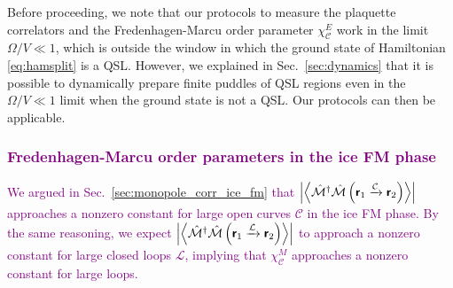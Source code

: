 \documentclass[twocolumn,superscriptaddress,amsmath,amssymb,aps,prx,nofootinbib]{revtex4-2}
\newcommand{\dual}[1]{\boldsymbol{\mathsf{#1}}}
\newcommand{\newtext}[1]{\textcolor{purple}{#1}}
\begin{document}
Before proceeding, we note that our protocols to measure the plaquette correlators and the Fredenhagen-Marcu order parameter $\chi_\mathcal{C}^E$ work in the limit $\Omega/V \ll 1$, which is outside the window in which the ground state of Hamiltonian \eqref{eq:hamsplit} is a QSL. However, we explained in Sec.~\ref{sec:dynamics} that it is possible to dynamically prepare finite puddles of QSL regions even in the $\Omega /V \ll 1$ limit when the ground state is not a QSL. Our protocols can then be applicable. 

\newtext{\subsubsection{Fredenhagen-Marcu order parameters in the ice FM phase}}
\label{sec:FM_ice_fm}

\newtext{We argued in Sec.~\ref{sec:monopole_corr_ice_fm} that $\abs{ \expval{ \hat{\mathcal{M}}^\dagger \hat{\mathcal{M}} \left(\dual{r}_1 \xrightarrow{\mathcal{C}} \dual{r}_2 \right)} }$ approaches a nonzero constant for large open curves $\mathcal{C}$ in the ice FM phase. By the same reasoning, we expect  $\abs{ \expval{ \hat{\mathcal{M}}^\dagger \hat{\mathcal{M}} \left(\dual{r}_1 \xrightarrow{\mathcal{L}} \dual{r}_2 \right) } }$ to approach a nonzero constant for large closed loops $\mathcal{L}$, implying that $\chi_\mathcal{C}^M$ approaches a nonzero constant for large loops.} 
\end{document}
